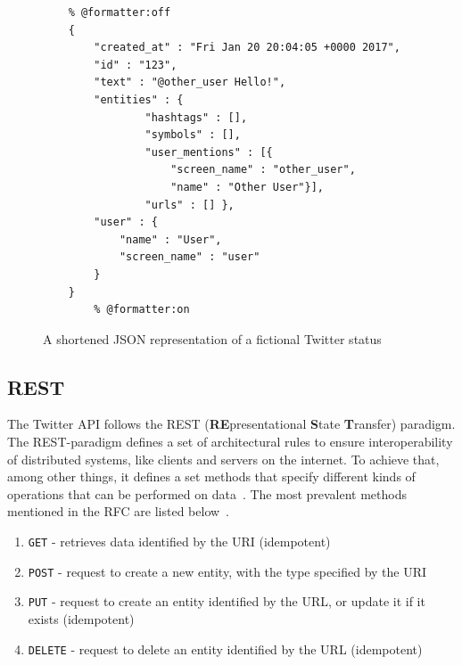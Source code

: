 
\begin{figure}
    \caption{A shortened JSON representation of a fictional Twitter status}
    \label{code:json}
    \begin{verbatim}
    % @formatter:off
    {
        "created_at" : "Fri Jan 20 20:04:05 +0000 2017",
        "id" : "123",
        "text" : "@other_user Hello!",
        "entities" : {
                "hashtags" : [],
                "symbols" : [],
                "user_mentions" : [{
                    "screen_name" : "other_user",
                    "name" : "Other User"}],
                "urls" : [] },
        "user" : {
            "name" : "User",
            "screen_name" : "user"
        }
    }
        % @formatter:on
    \end{verbatim}
\end{figure}

\subsection{REST}
\label{subsec:rest}

The Twitter API follows the REST (\textbf{RE}presentational \textbf{S}tate \textbf{T}ransfer) paradigm.
The REST-paradigm defines a set of architectural rules to ensure interoperability of distributed systems,
like clients and servers on the internet.
To achieve that, among other things,
it defines a set methods that specify different kinds of operations that can be performed on data~\cite{Jakl2008}.
The most prevalent methods mentioned in the RFC are listed below~\cite{RFC2616}.

\begin{enumerate}
    \item
    \texttt{GET} - retrieves data identified by the URI (idempotent)
    \item
    \texttt{POST} - request to create a new entity, with the type specified by the URI
    \item
    \texttt{PUT} - request to create an entity identified by the URL, or update it if it exists (idempotent)
    \item
    \texttt{DELETE} - request to delete an entity identified by the URL (idempotent)
\end{enumerate}

